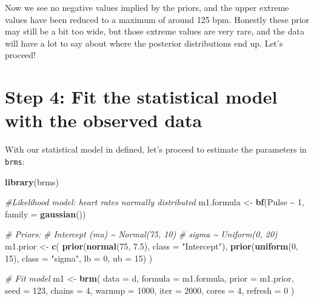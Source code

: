 \documentclass[
]{book}
\newenvironment{Shaded}{\begin{snugshade}}{\end{snugshade}}
\newcommand{\AttributeTok}[1]{\textcolor[rgb]{0.13,0.29,0.53}{#1}}
\newcommand{\CommentTok}[1]{\textcolor[rgb]{0.56,0.35,0.01}{\textit{#1}}}
\newcommand{\DecValTok}[1]{\textcolor[rgb]{0.00,0.00,0.81}{#1}}
\newcommand{\FloatTok}[1]{\textcolor[rgb]{0.00,0.00,0.81}{#1}}
\newcommand{\FunctionTok}[1]{\textcolor[rgb]{0.13,0.29,0.53}{\textbf{#1}}}
\newcommand{\NormalTok}[1]{#1}
\newcommand{\OtherTok}[1]{\textcolor[rgb]{0.56,0.35,0.01}{#1}}
\newcommand{\SpecialCharTok}[1]{\textcolor[rgb]{0.81,0.36,0.00}{\textbf{#1}}}
\newcommand{\StringTok}[1]{\textcolor[rgb]{0.31,0.60,0.02}{#1}}
\begin{document}
Now we see no negative values implied by the priors, and the upper extreme values have been reduced to a maximum of around 125 bpm. Honestly these prior may still be a bit too wide, but those extreme values are very rare, and the data will have a lot to say about where the posterior distributions end up. Let's proceed!

\section{Step 4: Fit the statistical model with the observed data}\label{step-4-fit-the-statistical-model-with-the-observed-data}

With our statistical model in defined, let's proceed to estimate the parameters in \texttt{brms}:

\begin{Shaded}
\begin{Highlighting}[]
\FunctionTok{library}\NormalTok{(brms)}

\CommentTok{\#Likelihood model: heart rates normally distributed}
\NormalTok{m1.formula }\OtherTok{\textless{}{-}} \FunctionTok{bf}\NormalTok{(Pulse }\SpecialCharTok{\textasciitilde{}} \DecValTok{1}\NormalTok{, }\AttributeTok{family =} \FunctionTok{gaussian}\NormalTok{())}

\CommentTok{\# Priors:}
\CommentTok{\#   Intercept (mu) \textasciitilde{} Normal(75, 10)}
\CommentTok{\#   sigma \textasciitilde{} Uniform(0, 20)}
\NormalTok{m1.prior }\OtherTok{\textless{}{-}} \FunctionTok{c}\NormalTok{(}
  \FunctionTok{prior}\NormalTok{(}\FunctionTok{normal}\NormalTok{(}\DecValTok{75}\NormalTok{, }\FloatTok{7.5}\NormalTok{), }\AttributeTok{class =} \StringTok{"Intercept"}\NormalTok{),}
  \FunctionTok{prior}\NormalTok{(}\FunctionTok{uniform}\NormalTok{(}\DecValTok{0}\NormalTok{, }\DecValTok{15}\NormalTok{), }\AttributeTok{class =} \StringTok{"sigma"}\NormalTok{, }\AttributeTok{lb =} \DecValTok{0}\NormalTok{, }\AttributeTok{ub =} \DecValTok{15}\NormalTok{)}
\NormalTok{)}

\CommentTok{\# Fit model}
\NormalTok{m1 }\OtherTok{\textless{}{-}} \FunctionTok{brm}\NormalTok{(}
  \AttributeTok{data =}\NormalTok{ d,}
  \AttributeTok{formula =}\NormalTok{ m1.formula,}
  \AttributeTok{prior =}\NormalTok{ m1.prior,}
  \AttributeTok{seed =} \DecValTok{123}\NormalTok{,}
  \AttributeTok{chains =} \DecValTok{4}\NormalTok{, }\AttributeTok{warmup =} \DecValTok{1000}\NormalTok{, }\AttributeTok{iter =} \DecValTok{2000}\NormalTok{, }\AttributeTok{cores =} \DecValTok{4}\NormalTok{,}
  \AttributeTok{refresh =} \DecValTok{0}
\NormalTok{)}
\end{Highlighting}
\end{Shaded}
\end{document}
